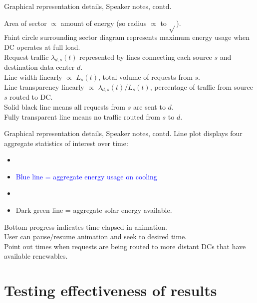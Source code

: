 \documentclass[xcolor=dvipsnames]{beamer}
\begin{document}
\begin{frame}{Graphical representation details, Speaker notes, contd.}

	Area of sector $\propto$ amount of energy (so radius $\propto$ to $\sqrt{}$). \\ 
	Faint circle surrounding sector diagram represents maximum energy usage when DC operates at full load. \\
	Request traffic $\lambda_{d,s}(t)$ represented by lines connecting each source $s$ and destination data center $d$. \\
	Line width linearly $\propto$ $L_s(t)$, total volume of requests from $s$. \\
	Line transparency linearly $\propto$ ${\lambda_{d,s}(t)} / {L_s(t)}$, percentage of traffic from source $s$ routed to DC.  \\
	Solid black line means all requests from $s$ are sent to $d$. \\
	Fully transparent line means no traffic routed from $s$ to $d$.
\end{frame}

\begin{frame}{Graphical representation details, Speaker notes, contd.}
	Line plot displays four aggregate statistics of interest over time: 
	\begin{itemize}
	\item{\textcolor{yellow}{}}
	\item{\textcolor{blue}{Blue line = aggregate energy usage on cooling}}
	\item{\textcolor{green}{}}
	\item{\textcolor{dgreen}{Dark green line = aggregate solar energy available}.}
	\end{itemize}
	Bottom progress indicates time elapsed in animation. \\
	User can pause/resume animation and seek to desired time.\\
	Point out times when requests are being routed to more distant DCs that have available renewables.
\end{frame}


\section{Testing effectiveness of results}
\end{document}

